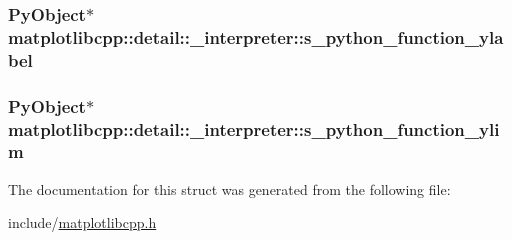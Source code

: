 \subsubsection[{\texorpdfstring{s\+\_\+python\+\_\+function\+\_\+ylabel}{s_python_function_ylabel}}]{\setlength{\rightskip}{0pt plus 5cm}Py\+Object$\ast$ matplotlibcpp\+::detail\+::\+\_\+interpreter\+::s\+\_\+python\+\_\+function\+\_\+ylabel}\hypertarget{structmatplotlibcpp_1_1detail_1_1__interpreter_aa90a8153eb9c50bf42a26ea1689fbf19}{}\label{structmatplotlibcpp_1_1detail_1_1__interpreter_aa90a8153eb9c50bf42a26ea1689fbf19}
\subsubsection[{\texorpdfstring{s\+\_\+python\+\_\+function\+\_\+ylim}{s_python_function_ylim}}]{\setlength{\rightskip}{0pt plus 5cm}Py\+Object$\ast$ matplotlibcpp\+::detail\+::\+\_\+interpreter\+::s\+\_\+python\+\_\+function\+\_\+ylim}\hypertarget{structmatplotlibcpp_1_1detail_1_1__interpreter_afa69df018d0a76c3525693f09197176f}{}\label{structmatplotlibcpp_1_1detail_1_1__interpreter_afa69df018d0a76c3525693f09197176f}


The documentation for this struct was generated from the following file\+:\begin{DoxyCompactItemize}
\item 
include/\hyperlink{matplotlibcpp_8h}{matplotlibcpp.\+h}\end{DoxyCompactItemize}
